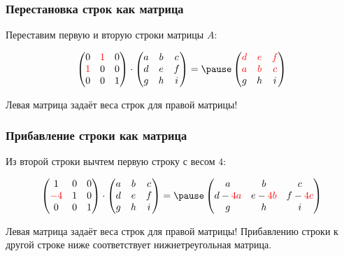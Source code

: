 \begin{frame}
    \frametitle{Перестановка строк как матрица}

 
Переставим первую и вторую строки матрицы $A$:

    \[
    \begin{pmatrix}
        0 & \red{1} & 0 \\
        \red{1} & 0 & 0 \\
        0 & 0 & 1 \\
    \end{pmatrix}   \cdot 
    \begin{pmatrix}
        a & b & c \\
        d & e & f \\
        g & h & i \\
    \end{pmatrix} =\pause
\begin{pmatrix}
    \red{d} & \red{e} & \red{f} \\
    \red{a} & \red{b} & \red{c} \\
    g & h & i \\
\end{pmatrix}   
    \]

    Левая матрица задаёт веса строк для правой матрицы!


\end{frame}


\begin{frame}
    \frametitle{Прибавление строки как матрица}

    Из второй строки вычтем первую строку с весом $4$:

    \[
    \begin{pmatrix}
        1 & 0 & 0 \\
        \red{-4} & 1 & 0 \\
        0 & 0 & 1 \\
    \end{pmatrix}   \cdot 
    \begin{pmatrix}
        a & b & c \\
        d & e & f \\
        g & h & i \\
    \end{pmatrix} =\pause
\begin{pmatrix}
    a & b & c \\
    d -\red{4a} & e - \red{4b} & f-\red{4c} \\
    g & h & i \\
\end{pmatrix}   
    \]
    
    Левая матрица задаёт веса строк для правой матрицы!
 \pause
 Прибавлению строки к другой строке ниже соответствует нижнетреугольная матрица.

\end{frame}



